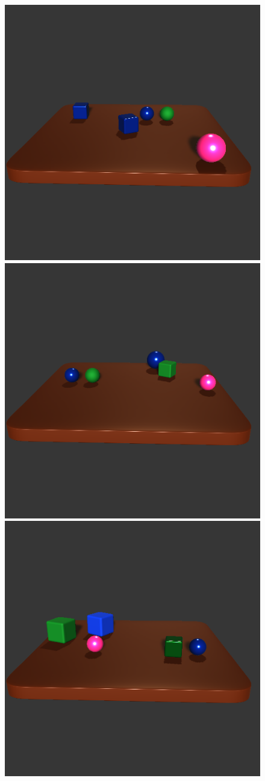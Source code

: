 \documentclass[
]{ceurart}
\begin{document}
	\begin{figure}[t]
		\centering
		\begin{minipage}{0.4\textwidth}
			\centering
			\includegraphics[width=0.3\linewidth]{img/intro_hide/true1.png} 
			\includegraphics[width=0.3\linewidth]{img/intro_hide/true2.png} 
			\includegraphics[width=0.3\linewidth]{img/intro_hide/true3.png} 
			

\end{minipage}
\end{figure}
\end{document}

